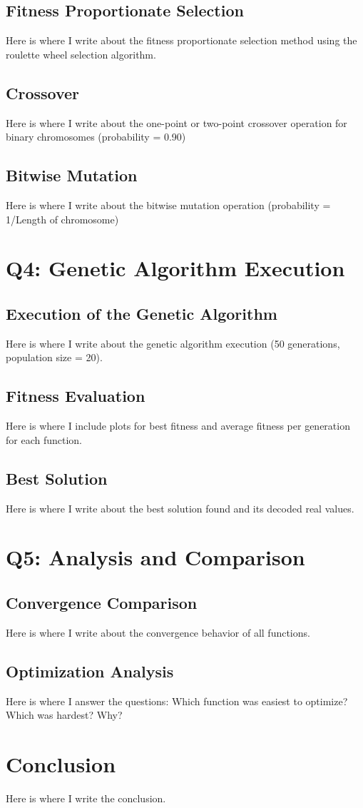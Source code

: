 \documentclass[journal,12pt,onecolumn]{IEEEtran}
\begin{document}
\subsection{Fitness Proportionate Selection}
Here is where I write about the fitness proportionate selection method using the roulette wheel selection algorithm.

\subsection{Crossover}
Here is where I write about the one-point or two-point crossover operation for binary chromosomes (probability = 0.90)

\subsection{Bitwise Mutation}
Here is where I write about the bitwise mutation operation (probability = 1/Length of chromosome)

\section{Q4: Genetic Algorithm Execution}

\subsection{Execution of the Genetic Algorithm}
Here is where I write about the genetic algorithm execution (50 generations, population size = 20).

\subsection{Fitness Evaluation}
Here is where I include plots for best fitness and average fitness per generation for each function.

\subsection{Best Solution}
Here is where I write about the best solution found and its decoded real values.

\section{Q5: Analysis and Comparison}

\subsection{Convergence Comparison}
Here is where I write about the convergence behavior of all functions.

\subsection{Optimization Analysis}
Here is where I answer the questions: Which function was easiest to optimize? Which was hardest? Why?

\section{Conclusion}
Here is where I write the conclusion.
\end{document}
